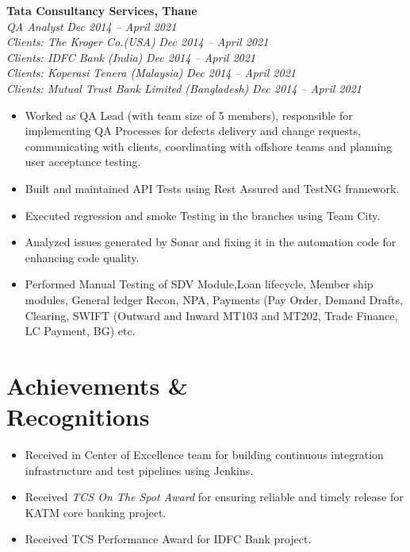 \documentclass[margin,line]{resume}
\begin{document}
\begin{resume}
    \textbf{Tata Consultancy Services, Thane}\\
           \textsl{QA Analyst} \hfill \textsl{Dec 2014 -- April 2021} \vspace{0mm}\\
           \textsl{Clients: The Kroger Co.(USA)} \hfill \textsl{Dec 2014 -- April 2021} \vspace{0mm}\\
           \textsl{Clients: IDFC Bank (India)} \hfill \textsl{Dec 2014 -- April 2021} \vspace{0mm}\\
           \textsl{Clients: Koperasi Tenera (Malaysia)} \hfill \textsl{Dec 2014 -- April 2021} \vspace{0mm}\\
           \textsl{Clients: Mutual Trust Bank Limited (Bangladesh)} \hfill \textsl{Dec 2014 -- April 2021} \vspace{0mm}\\
    \begin{itemize}
            \item Worked as QA Lead (with team size of 5 members), responsible for implementing QA Processes for defects delivery  and change requests, communicating with clients, coordinating with offshore teams and planning user acceptance testing.
            \item Built and maintained API Tests using Rest Assured and TestNG framework.
            \item Executed regression and smoke Testing in the branches
using Team City.
            \item Analyzed issues generated by Sonar and fixing it in the automation code for enhancing code quality.
            \item Performed Manual Testing of SDV Module,Loan lifecycle, Member ship modules, General ledger Recon, NPA, Payments (Pay Order, Demand Drafts, Clearing, SWIFT (Outward and Inward MT103 and MT202, Trade Finance, LC Payment, BG) etc.
       \end{itemize}
    
\section{\mysidestyle Achievements \& \\ Recognitions}
\vspace{0mm}
    \begin{itemize}
             \item Received  in Center of Excellence team for building continuous integration infrastructure and test pipelines using Jenkins.    
            \item Received \textit{TCS On The Spot Award} for ensuring reliable and timely release for KATM core banking project.
            \item Received {TCS Performance Award} for IDFC Bank project.
    \end{itemize}


\end{resume}
\end{document}
